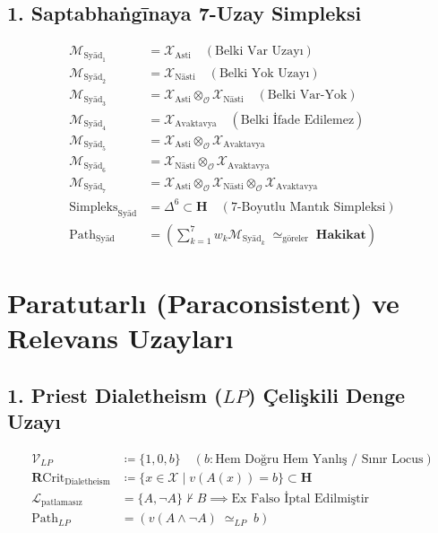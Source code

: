 \documentclass[11pt, a4paper]{article}
\begin{document}
\subsection{1. Saptabhaṅgīnaya 7-Uzay Simpleksi}
\begin{align}
\mathcal{M}_{\text{Syād}_1} &= \mathcal{X}_{\text{Asti}} \quad (\text{Belki Var Uzayı}) \\
\mathcal{M}_{\text{Syād}_2} &= \mathcal{X}_{\text{Nāsti}} \quad (\text{Belki Yok Uzayı}) \\
\mathcal{M}_{\text{Syād}_3} &= \mathcal{X}_{\text{Asti}} \otimes_{\mathcal{O}} \mathcal{X}_{\text{Nāsti}} \quad (\text{Belki Var-Yok}) \\
\mathcal{M}_{\text{Syād}_4} &= \mathcal{X}_{\text{Avaktavya}} \quad (\text{Belki İfade Edilemez}) \\
\mathcal{M}_{\text{Syād}_5} &= \mathcal{X}_{\text{Asti}} \otimes_{\mathcal{O}} \mathcal{X}_{\text{Avaktavya}} \\
\mathcal{M}_{\text{Syād}_6} &= \mathcal{X}_{\text{Nāsti}} \otimes_{\mathcal{O}} \mathcal{X}_{\text{Avaktavya}} \\
\mathcal{M}_{\text{Syād}_7} &= \mathcal{X}_{\text{Asti}} \otimes_{\mathcal{O}} \mathcal{X}_{\text{Nāsti}} \otimes_{\mathcal{O}} \mathcal{X}_{\text{Avaktavya}} \\
\text{Simpleks}_{\text{Syād}} &= \Delta^6 \subset \mathbf{H} \quad (7\text{-Boyutlu Mantık Simpleksi}) \\
\text{Path}_{\text{Syād}} &= \left( \sum_{k=1}^7 w_k \mathcal{M}_{\text{Syād}_k} \;\simeq_{\text{göreler}}\; \mathbf{Hakikat} \right)
\end{align}

\section{Paratutarlı (Paraconsistent) ve Relevans Uzayları}

\subsection{1. Priest Dialetheism ($LP$) Çelişkili Denge Uzayı}
\begin{align}
\mathcal{V}_{LP} &\coloneqq \{ 1, 0, b \} \quad (b: \text{Hem Doğru Hem Yanlış / Sınır Locus}) \\
\mathbf{R}\text{Crit}_{\text{Dialetheism}} &\coloneqq \{ x \in \mathcal{X} \mid v(A(x)) = b \} \subset \mathbf{H} \\
\mathcal{L}_{\text{patlamasız}} &= \{ A, \neg A \} \nvdash B \implies \text{Ex Falso İptal Edilmiştir} \\
\text{Path}_{LP} &= (v(A \land \neg A) \;\simeq_{LP}\; b)
\end{align}
\end{document}
